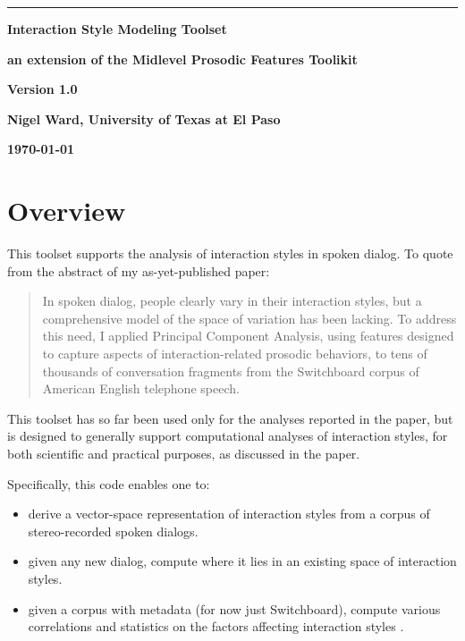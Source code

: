 \documentclass[11pt]{article}
\begin{document}
\noindent
\thispagestyle{empty}
\sloppy

\rule{1mm}{0mm}

\vspace{-17mm}
{\LARGE \bf Interaction Style Modeling  Toolset }

\smallskip
{\large \bf an extension of the  Midlevel Prosodic Features Toolikit}
\medskip


{\LARGE \bf Version 1.0}
\vspace{7mm}


{\bf Nigel Ward, University of Texas at El Paso}

{\bf \today }
\bigskip


\vspace{-3.5ex}
\section{Overview}    \label{sec:overview}

This toolset supports the analysis of interaction styles in spoken
dialog.  To quote from the abstract of  my as-yet-published paper:

\begin{quote}
  In spoken dialog, people clearly vary in their interaction styles,
  but a comprehensive model of the space of variation has been
  lacking.  To address this need, I applied Principal Component
  Analysis, using features designed to capture aspects of
  interaction-related prosodic behaviors, to tens of thousands of conversation
  fragments from the Switchboard corpus of American English telephone
  speech. 
\end{quote}


This toolset has so far been used only for the analyses reported in
the paper, but is designed to generally support computational
analyses of interaction styles, for both scientific and practical
purposes, as discussed in the paper.

Specifically, this code enables one to:

\begin{itemize}   \setlength{\itemsep}{0pt}\setlength{\parskip}{0pt}
\item derive a vector-space representation of interaction styles from
  a corpus of stereo-recorded spoken dialogs.
\item given any new dialog, compute
  where it lies in an existing space of interaction styles.
\item given a corpus with metadata (for now just  Switchboard), compute various
  correlations and statistics on the factors affecting interaction styles .
\end{itemize}
\end{document}
